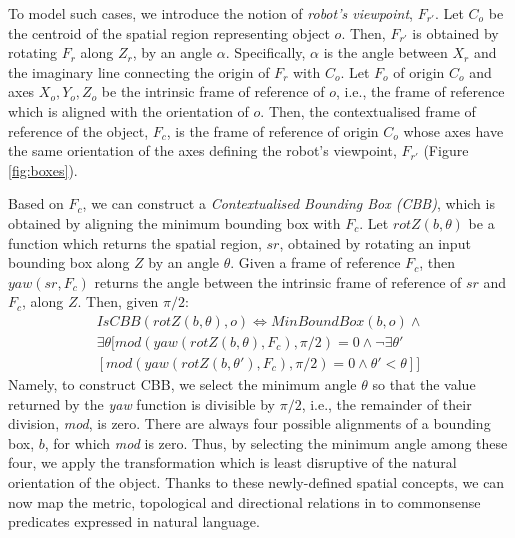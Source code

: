 \documentclass{article}
\begin{document}
To model such cases, we introduce the notion of \textit{robot's viewpoint}, $F_{r'}$. Let  $C_{o}$ be the centroid of the spatial region representing object $o$. Then, $F_{r'}$ is obtained by rotating $F_r$ along $Z_r$, by an angle $\alpha$. Specifically, $\alpha$ is the angle between $X_r$ and the imaginary line connecting the origin of $F_r$ with $C_o$.    
Let $F_o$ of origin $C_{o}$ and axes $X_o,Y_o,Z_o$ be the intrinsic frame of reference of $o$, i.e., the frame of reference which is aligned with the orientation of $o$. 
Then, the contextualised frame of reference of the object, $F_c$, is the frame of reference of origin $C_{o}$ whose axes have the same orientation of the axes defining the robot's viewpoint, $F_{r'}$ (Figure \ref{fig:boxes}). 

Based on $F_c$, we can construct a \textit{Contextualised Bounding Box (CBB)}, which is obtained by aligning the minimum bounding box with $F_c$. Let $\textit{rotZ}(b,\theta)$ be a function which returns the spatial region, $sr$, obtained by rotating an input bounding box along $Z$ by an angle $\theta$. Given a frame of reference $F_c$, then $\textit{yaw}(sr,F_c)$ returns the angle between the intrinsic frame of reference of $sr$ and $F_c$, along $Z$. Then, given $\pi/2$:
\begin{multline}
    \textit{IsCBB}(\textit{rotZ}(b,\theta),o) \Leftrightarrow 
    \textit{MinBoundBox}(b,o)  \wedge  \\
    \exists \theta[\textit{mod}(\textit{yaw}(\textit{rotZ}(b,\theta),F_c), \pi/2) = 0 \wedge \neg \exists \theta'  \\
    [\textit{mod}(\textit{yaw}(\textit{rotZ}(b,\theta'),F_c), \pi/2 ) = 0 \wedge \theta' < \theta]] 
\end{multline}
Namely, to construct CBB, we select the minimum angle $\theta$ so that the value returned by the \textit{yaw} function is divisible by $\pi/2$, i.e., the remainder of their division, \textit{mod}, is zero. There are always four possible alignments of a bounding box, $b$, for which \textit{mod} is zero. Thus, by selecting the minimum angle among these four, we apply the transformation which is least disruptive of the natural orientation of the object.
Thanks to these newly-defined spatial concepts, we can now map the metric, topological and directional relations in \cite{borrmann_query_2010,deeken_grounding_2018} to commonsense predicates expressed in natural language.  
\end{document}

